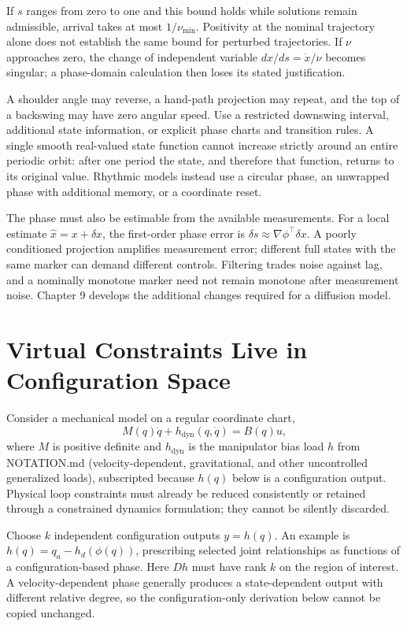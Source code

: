 If $s$ ranges from zero to one and this bound holds while solutions remain admissible, arrival takes at most $1/\nu_{\min}$. Positivity at the nominal trajectory alone does not establish the same bound for perturbed trajectories. If $\nu$ approaches zero, the change of independent variable $dx/ds=\dot x/\nu$ becomes singular; a phase-domain calculation then loses its stated justification.

A shoulder angle may reverse, a hand-path projection may repeat, and the top of a backswing may have zero angular speed. Use a restricted downswing interval, additional state information, or explicit phase charts and transition rules. A single smooth real-valued state function cannot increase strictly around an entire periodic orbit: after one period the state, and therefore that function, returns to its original value. Rhythmic models instead use a circular phase, an unwrapped phase with additional memory, or a coordinate reset.

The phase must also be estimable from the available measurements. For a local estimate $\hat x=x+\delta x$, the first-order phase error is $\delta s\approx\nabla\phi^\top\delta x$. A poorly conditioned projection amplifies measurement error; different full states with the same marker can demand different controls. Filtering trades noise against lag, and a nominally monotone marker need not remain monotone after measurement noise. Chapter 9 develops the additional changes required for a diffusion model.

\section{Virtual Constraints Live in Configuration Space}

Consider a mechanical model on a regular coordinate chart,
\begin{equation}
M(q)\ddot q+h_{\mathrm{dyn}}(q,\dot q)=B(q)u ,
\end{equation}
where $M$ is positive definite and $h_{\mathrm{dyn}}$ is the manipulator bias load $h$ from NOTATION.md (velocity-dependent, gravitational, and other uncontrolled generalized loads), subscripted because $h(q)$ below is a configuration output. Physical loop constraints must already be reduced consistently or retained through a constrained dynamics formulation; they cannot be silently discarded.

Choose $k$ independent configuration outputs $y=h(q)$. An example is $h(q)=q_a-h_d(\phi(q))$, prescribing selected joint relationships as functions of a configuration-based phase. Here $Dh$ must have rank $k$ on the region of interest. A velocity-dependent phase generally produces a state-dependent output with different relative degree, so the configuration-only derivation below cannot be copied unchanged.

